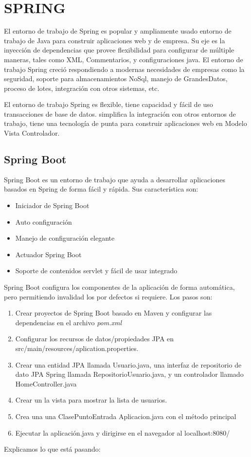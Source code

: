 \chapter{SPRING}
El entorno de trabajo de Spring es popular y ampliamente usado entorno de trabajo de Java para construir aplicaciones web y de empresa. Su eje es la inyección de dependencias que provee flexibilidad para configurar de múltiple maneras, tales como XML, Commentarios, y configuraciones java. El entorno de trabajo Spring creció respondiendo a modernas necesidades de empresas como la seguridad, soporte para almacenamientos NoSql, manejo de GrandesDatos, proceso de lotes, integración con otros sistemas, etc. 

El entorno de trabajo Spring es flexible, tiene capacidad y fácil de uso transacciones de base de datos. simplifica la integración con otros entornos de trabajo, tiene una tecnología de punta para construir aplicaciones web en Modelo Vista Controlador. 
\section{Spring Boot}
Spring Boot es un entorno de trabajo que ayuda a desarrollar aplicaciones basados en Spring de forma fácil y rápida. Sus característica son:
\begin{itemize}
\item Iniciador de Spring Boot
\item Auto configuración
\item Manejo de configuración elegante
\item Actuador Spring Boot
\item Soporte de contenidos servlet y fácil de usar integrado
\end{itemize}

Spring Boot configura los componentes de la aplicación de forma automática, pero permitiendo invalidad los por defectos si requiere. 
Los pasos son:
\begin{enumerate}
\item Crear proyectos de Spring Boot basado en Maven y configurar las dependencias en el archivo \textit{pom.xml}
\item Configurar los recursos de datos/propiedades JPA en src/main/resources/aplication.properties.
\item Crear una entidad JPA llamada Usuario.java, una interfaz de repositorio de dato JPA Spring llamada RepositorioUsuario.java, y un controlador llamado HomeController.java
\item Crear un la vista para mostrar la lista de usuarios. 
\item Crea una una ClasePuntoEntrada Aplicacion.java con el método principal
\item Ejecutar la aplicación.java y dirigirse en el navegador al localhost:8080/
\end{enumerate}
Explicamos lo que está pasando:
